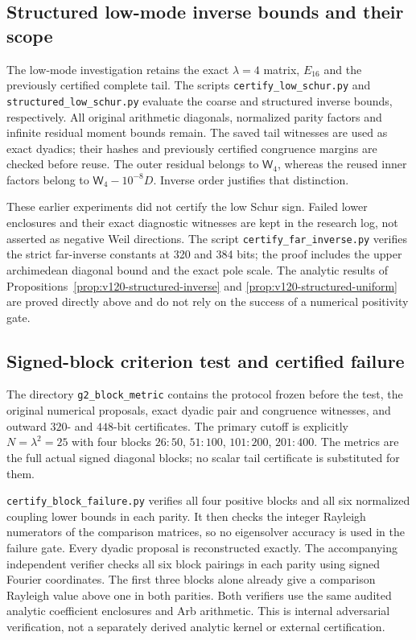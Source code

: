 \documentclass[11pt]{article}
\theoremstyle{remark}
\begin{document}
\subsection*{Structured low-mode inverse bounds and their scope}
The low-mode investigation retains the exact $\lambda=4$ matrix,
$E_{16}$ and the previously certified complete tail. The scripts
\texttt{certify\_low\_schur.py} and
\texttt{structured\_low\_schur.py} evaluate the coarse and structured
inverse bounds, respectively. All original arithmetic diagonals,
normalized parity factors and infinite residual moment bounds remain.
The saved tail witnesses are used as exact dyadics; their hashes and
previously certified congruence margins are checked before reuse.
The outer residual belongs to $\mathsf W_4$, whereas the reused inner
factors belong to $\mathsf W_4-10^{-8}D$. Inverse order justifies
that distinction.

These earlier experiments did not certify the low Schur sign. Failed
lower enclosures and their exact diagnostic witnesses are kept in the
research log, not asserted as negative Weil directions. The script \texttt{certify\_far\_inverse.py} verifies the
strict far-inverse constants at 320 and 384 bits; the proof includes
the upper archimedean diagonal bound and the exact pole scale.
The analytic
results of Propositions~\ref{prop:v120-structured-inverse} and
\ref{prop:v120-structured-uniform} are proved directly above and
do not rely on the success of a numerical positivity gate.



\subsection*{Signed-block criterion test and certified failure}
\label{app:v128-test}
The directory \texttt{g2\_block\_metric} contains the protocol frozen
before the test, the original numerical proposals, exact dyadic pair
and congruence witnesses, and outward $320$- and $448$-bit certificates.
The primary cutoff is explicitly $N=\lambda^2=25$ with four blocks
$26{:}50$, $51{:}100$, $101{:}200$, $201{:}400$. The metrics are the
full actual signed diagonal blocks; no scalar tail certificate is
substituted for them.

\nolinkurl{certify_block_failure.py} verifies all four positive blocks
and all six normalized coupling lower bounds in each parity. It
then checks the integer Rayleigh numerators of the comparison
matrices, so no eigensolver accuracy is used in the failure gate.
Every dyadic proposal is reconstructed exactly. The accompanying
independent verifier checks all six block pairings in each parity
using signed Fourier coordinates. The first three blocks alone
already give a comparison Rayleigh value above one in both parities. Both verifiers use the
same audited analytic coefficient enclosures and Arb arithmetic.
This is internal adversarial verification, not a separately derived
analytic kernel or external certification.
\end{document}
